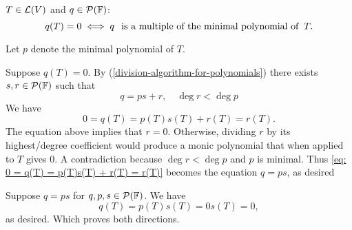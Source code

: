 \setcounter{thm}{28}
\begin{thm}
  \label{thm: every zero polynomial is a multiple of the minimal polynomial}
  $T\in \mathcal{L}(V)$ and $q \in \mathcal{P} (\mathbb{F})$:
  \begin{equation}
    q(T)=0 \iff q \;\;\, \text{is a multiple of the minimal polynomial of}\;\; T.
  \end{equation}
\end{thm}
\begin{prf}
  Let $p$ denote the minimal polynomial of $T$.

  \begin{description}

    \item{}{
      Suppose $q(T)=0$.
      By (\ref{division-algorithm-for-polynomials}) there exists $s,r \in \mathcal{P} (\mathbb{F})$ such that
      \begin{equation}
        q=ps+r, \quad \deg r < \deg p
      \end{equation}
      We have
      \begin{equation}
        \label{eq: 0 = q(T) = p(T)s(T) + r(T) = r(T)}
        0 = q(T) = p(T)s(T) + r(T) = r(T).
      \end{equation}
      The equation above implies that $r=0$. Otherwise, dividing $r$ by its highest\-/degree coefficient would produce a monic polynomial that when applied to $T$ gives $0$. A contradiction because $\deg r < \deg p$ and $p$ is minimal. Thus \eqref{eq: 0 = q(T) = p(T)s(T) + r(T) = r(T)} becomes the equation $q=ps$, as desired
    }
    \item{}{
      Suppose $q=ps$ for $q,p,s \in \mathcal{P}(\mathbb{F})$. We have
      \begin{equation}
        q(T) = p(T)s(T)=0s(T)=0,
      \end{equation}
      as desired. Which proves both directions.
    }
  \end{description}
   \vspace*{-\baselineskip}
\end{prf}

